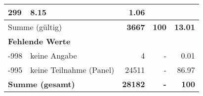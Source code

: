 \begin{longtable}{lXrrr}
       \num{299} &
       \num[round-mode=places,round-precision=2]{8,15} &
         \num[round-mode=places,round-precision=2]{1,06} \\
     \midrule
     \multicolumn{2}{l}{Summe (gültig)} &
       \textbf{\num{3667}} &
     \textbf{100} &
       \textbf{\num[round-mode=places,round-precision=2]{13,01}} \\
     \multicolumn{5}{l}{\textbf{Fehlende Werte}}\\
       -998 &
       keine Angabe &
         \num{4} &
        - &
         \num[round-mode=places,round-precision=2]{0,01} \\
       -995 &
       keine Teilnahme (Panel) &
         \num{24511} &
        - &
         \num[round-mode=places,round-precision=2]{86,97} \\
     \midrule
     \multicolumn{2}{l}{\textbf{Summe (gesamt)}} &
          \textbf{\num{28182}} &
        \textbf{-} &
        \textbf{100} \\
     \bottomrule
     \end{longtable}
     
